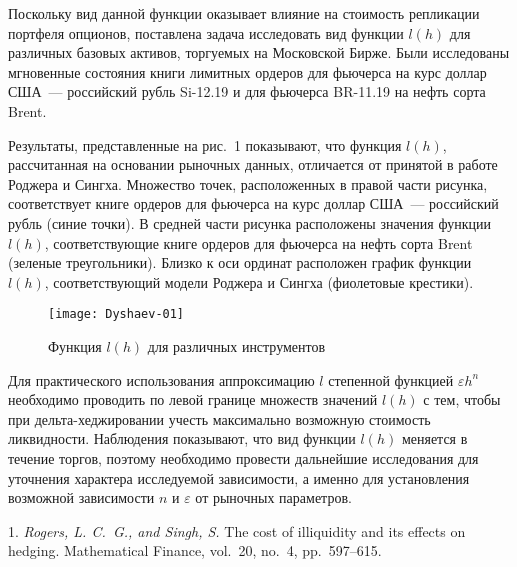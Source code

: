 Поскольку вид данной функции оказывает влияние на стоимость репликации портфеля опционов,  поставлена задача исследовать вид функции $l(h)$ для различных базовых активов, торгуемых на Московской Бирже. Были исследованы мгновенные состояния книги лимитных ордеров для фьючерса на курс доллар США~--- российский рубль Si-12.19 и для фьючерса BR-11.19 на нефть сорта Brent.

Результаты, представленные на рис.~1 показывают, что функция  $l(h)$, рассчитанная на основании рыночных данных, отличается от принятой в работе Роджера и Сингха. Множество точек, расположенных в правой части рисунка, соответствует книге ордеров для фьючерса на курс доллар США~--- российский рубль (синие точки). В средней части рисунка расположены значения функции $l(h)$, соответствующие книге ордеров для фьючерса на нефть сорта Brent (зеленые треугольники). Близко к оси ординат расположен график функции $l(h)$, соответствующий модели Роджера и Сингха (фиолетовые крестики).
\begin{figure}
	\centering
	\texttt{[image: Dyshaev-01]}
	\caption{\footnotesize Функция $l(h)$ для различных инструментов}
	\label{fig:dyshaev-01}
\end{figure}

Для практического использования аппроксимацию $l$ степенной функцией $\varepsilon h^n$ необходимо проводить по левой границе множеств значений $l(h)$ с тем, чтобы при дельта-хед\-жи\-ро\-ва\-нии учесть максимально возможную стоимость ликвидности. Наблюдения показывают, что вид функции $l(h)$ меняется в течение торгов, поэтому необходимо провести дальнейшие исследования для уточнения характера исследуемой зависимости, а именно для установления возможной зависимости  $n$ и $\varepsilon$ от  рыночных параметров.

\litlist

1. {\it Rogers, L. C.~G., and Singh, S.} The cost of illiquidity and its effects on hedging. Mathematical Finance, vol.~20, no.~4, pp.~597--615.
